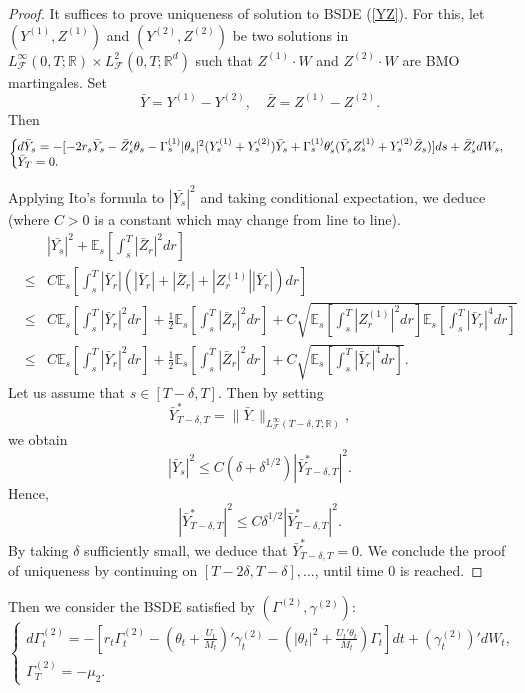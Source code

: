 \documentclass[final]{siamltex}
\begin{document}
\begin{proof}
It suffices to prove uniqueness of solution to BSDE (\ref{YZ}). For this, let $(Y^{(1)},Z^{(1)})$ and $(Y^{(2)},Z^{(2)})$ be two solutions in  $L_{{\mathcal F}}^\infty(0,T;{\mathbb{R}})\times L_{{\mathcal F}}^2(0,T;{\mathbb{R}}^d)   $ such that
$Z^{(1)}\cdot W$ and $Z^{(2)}\cdot W$ are BMO martingales. Set
$$\bar{Y}=Y^{(1)}-Y^{(2)},\quad \bar{Z}=Z^{(1)}-Z^{(2)}.$$
Then
\begin{equation}\label{Y'Z'}
\left\{\hspace{-0.2cm}\begin{array}{l}
        d\bar{Y}_s=-[-2r_s \bar{Y}_s- \bar{Z}_s'\theta_s -\Gamma^{(1)}_s |\theta_s |^2(Y^{(1)}_s+Y^{(2)}_s)\bar{Y}_s
        +\Gamma_s^{(1)}\theta_s ' (\bar{Y}_sZ^{(1)}_s
+Y^{(2)}_s \bar{Z}_s)]ds+\bar{Z}_s' dW_s,\\
\bar{Y}_T=0.\end{array}\right.
\end{equation}

Applying Ito's formula to $|\bar{Y_s}|^2$ and taking conditional expectation, we deduce (where $C>0$ is a constant which may change from line to line).
\begin{eqnarray*}
& &|\bar{Y_s}|^2+\mathbb E_s\left[\int_s^T |\bar{Z}_r|^2 dr\right]\\
&\le & C \mathbb E_s \left[\int_s^T |\bar{Y}_r| (|\bar{Y}_r|+ |\bar{Z}_r| +|Z^{(1)}_r||\bar{Y}_r|)dr\right]\\
&\le& C \mathbb E_s\left[\int_s^T |\bar{Y}_r|^2 dr\right]+\frac{1}{2} \mathbb E_s\left[\int_s^T |\bar{Z}_r|^2 dr\right]+C\sqrt{\mathbb E_s\left[\int_s^T |Z^{(1)}_r|^2 dr\right] \mathbb E_s\left[\int_s^T |\bar{Y}_r|^4 dr\right]}\\
&\le& C \mathbb E_s\left[\int_s^T |\bar{Y}_r|^2
dr\right]+\frac{1}{2} \mathbb E_s\left[\int_s^T |\bar{Z}_r|^2
dr\right]+C\sqrt{\mathbb E_s\left[\int_s^T |\bar{Y}_r|^4
dr\right]}.
\end{eqnarray*}
Let us assume that $s\in [T-\delta,T]$. Then by setting
$$\bar{Y}^*_{T-\delta,T}=\|\bar{Y}_\cdot\|_{L_{{\mathcal F}}^\infty(T-\delta, T; {\mathbb{R}})},$$
we obtain
$$|\bar{Y}_s|^2\le C (\delta+\delta^{1/2}) |\bar{Y}^*_{T-\delta,T}|^2.$$
Hence,
$$|\bar{Y}^*_{T-\delta,T}|^2\le C\delta^{1/2}|\bar{Y}^*_{T-\delta,T}|^2.$$
By taking  $\delta$ sufficiently small, we deduce that $\bar{Y}^*_{T-\delta,T}=0$. We conclude the proof of uniqueness by continuing on $[T-2\delta,T-\delta],\dots$, until time 0 is reached.
\end{proof}

Then we consider the BSDE satisfied by $(\Gamma^{(2)},\gamma^{(2)})$:
\begin{equation}\label{gamma}
\left\{\begin{array}{l}
        d\Gamma^{(2)}_t=-\left[r_t\Gamma^{(2)}_t-\left(\theta_t+\frac{U_t}{M_t}\right)'\gamma^{(2)}_t-\left(|\theta_t|^2+\frac{U_t'\theta_t}{M_t}\right)\Gamma_t \right]dt+(\gamma^{(2)}_t )'dW_t,\\
\Gamma^{(2)}_T=-\mu_2.
\end{array}\right.
\end{equation}
\end{document}
